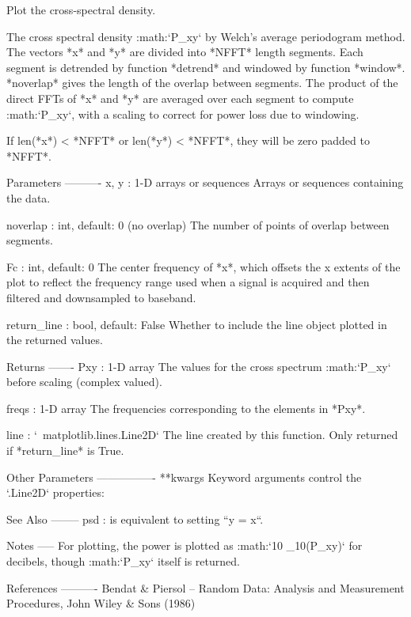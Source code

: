 \begin{DoxyVerb}Plot the cross-spectral density.

The cross spectral density :math:`P_{xy}` by Welch's average
periodogram method.  The vectors *x* and *y* are divided into
*NFFT* length segments.  Each segment is detrended by function
*detrend* and windowed by function *window*.  *noverlap* gives
the length of the overlap between segments.  The product of
the direct FFTs of *x* and *y* are averaged over each segment
to compute :math:`P_{xy}`, with a scaling to correct for power
loss due to windowing.

If len(*x*) < *NFFT* or len(*y*) < *NFFT*, they will be zero
padded to *NFFT*.

Parameters
----------
x, y : 1-D arrays or sequences
    Arrays or sequences containing the data.



noverlap : int, default: 0 (no overlap)
    The number of points of overlap between segments.

Fc : int, default: 0
    The center frequency of *x*, which offsets the x extents of the
    plot to reflect the frequency range used when a signal is acquired
    and then filtered and downsampled to baseband.

return_line : bool, default: False
    Whether to include the line object plotted in the returned values.

Returns
-------
Pxy : 1-D array
    The values for the cross spectrum :math:`P_{xy}` before scaling
    (complex valued).

freqs : 1-D array
    The frequencies corresponding to the elements in *Pxy*.

line : `~matplotlib.lines.Line2D`
    The line created by this function.
    Only returned if *return_line* is True.

Other Parameters
----------------
**kwargs
    Keyword arguments control the `.Line2D` properties:


See Also
--------
psd : is equivalent to setting ``y = x``.

Notes
-----
For plotting, the power is plotted as
:math:`10 \log_{10}(P_{xy})` for decibels, though :math:`P_{xy}` itself
is returned.

References
----------
Bendat & Piersol -- Random Data: Analysis and Measurement Procedures,
John Wiley & Sons (1986)
\end{DoxyVerb}
 \mbox{\label{classmatplotlib_1_1axes_1_1__axes_1_1Axes_ae7929e06bf54360c0f18b8dfe1978dfa}} 
